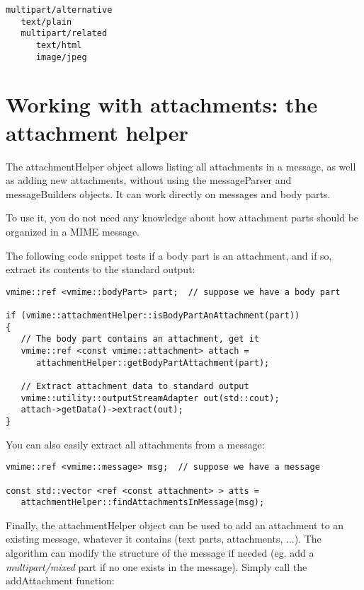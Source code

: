 \begin{verbatim}
multipart/alternative
   text/plain
   multipart/related
      text/html
      image/jpeg
\end{verbatim}


\section{Working with attachments: the attachment helper}

The {\vcode attachmentHelper} object allows listing all attachments in a
message, as well as adding new attachments, without using the
{\vcode messageParser} and {\vcode messageBuilders} objects. It can work
directly on messages and body parts.

To use it, you do not need any knowledge about how attachment parts should
be organized in a MIME message.

The following code snippet tests if a body part is an attachment, and if so,
extract its contents to the standard output:

\begin{lstlisting}[caption={Testing if a body part is an attachment}]
vmime::ref <vmime::bodyPart> part;  // suppose we have a body part

if (vmime::attachmentHelper::isBodyPartAnAttachment(part))
{
   // The body part contains an attachment, get it
   vmime::ref <const vmime::attachment> attach =
      attachmentHelper::getBodyPartAttachment(part);

   // Extract attachment data to standard output
   vmime::utility::outputStreamAdapter out(std::cout);
   attach->getData()->extract(out);
}
\end{lstlisting}

You can also easily extract all attachments from a message:

\begin{lstlisting}[caption={Extracting all attachments from a message}]
vmime::ref <vmime::message> msg;  // suppose we have a message

const std::vector <ref <const attachment> > atts =
   attachmentHelper::findAttachmentsInMessage(msg);
\end{lstlisting}

Finally, the {\vcode attachmentHelper} object can be used to add an
attachment to an existing message, whatever it contains (text parts,
attachments, ...). The algorithm can modify the structure of the
message if needed (eg. add a \emph{multipart/mixed} part if no one
exists in the message). Simply call the {\vcode addAttachment}
function:

